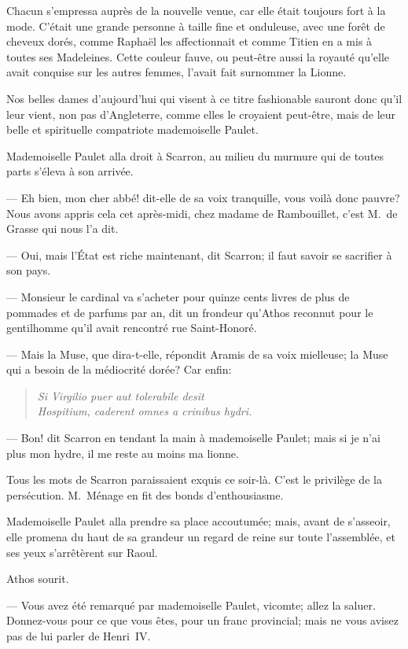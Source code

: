 Chacun s'empressa auprès de la nouvelle venue, car elle était toujours fort à la mode. C'était une grande personne à taille fine et onduleuse, avec une forêt de cheveux dorés, comme Raphaël les affectionnait et comme Titien en a mis à toutes ses Madeleines. Cette couleur fauve, ou peut-être aussi la royauté qu'elle avait conquise sur les autres femmes, l'avait fait surnommer la Lionne.

Nos belles dames d'aujourd'hui qui visent à ce titre fashionable sauront donc qu'il leur vient, non pas d'Angleterre, comme elles le croyaient peut-être, mais de leur belle et spirituelle compatriote mademoiselle Paulet.

Mademoiselle Paulet alla droit à Scarron, au milieu du murmure qui de toutes parts s'éleva à son arrivée.

— Eh bien, mon cher abbé! dit-elle de sa voix tranquille, vous voilà donc pauvre? Nous avons appris cela cet après-midi, chez madame de Rambouillet, c'est M.~de Grasse qui nous l'a dit.

— Oui, mais l'État est riche maintenant, dit Scarron; il faut savoir se sacrifier à son pays.

— Monsieur le cardinal va s'acheter pour quinze cents livres de plus de pommades et de parfums par an, dit un frondeur qu'Athos reconnut pour le gentilhomme qu'il avait rencontré rue Saint-Honoré.

— Mais la Muse, que dira-t-elle, répondit Aramis de sa voix mielleuse; la Muse qui a besoin de la médiocrité dorée? Car enfin:

\begin{verse}\itshape
Si Virgilio puer aut tolerabile desit\\
Hospitium, caderent omnes a crinibus hydri.
\end{verse}

— Bon! dit Scarron en tendant la main à mademoiselle Paulet; mais si je n'ai plus mon hydre, il me reste au moins ma lionne.

Tous les mots de Scarron paraissaient exquis ce soir-là. C'est le privilège de la persécution. M.~Ménage en fit des bonds d'enthousiasme.

Mademoiselle Paulet alla prendre sa place accoutumée; mais, avant de s'asseoir, elle promena du haut de sa grandeur un regard de reine sur toute l'assemblée, et ses yeux s'arrêtèrent sur Raoul.

Athos sourit.

— Vous avez été remarqué par mademoiselle Paulet, vicomte; allez la saluer. Donnez-vous pour ce que vous êtes, pour un franc provincial; mais ne vous avisez pas de lui parler de Henri~IV.

